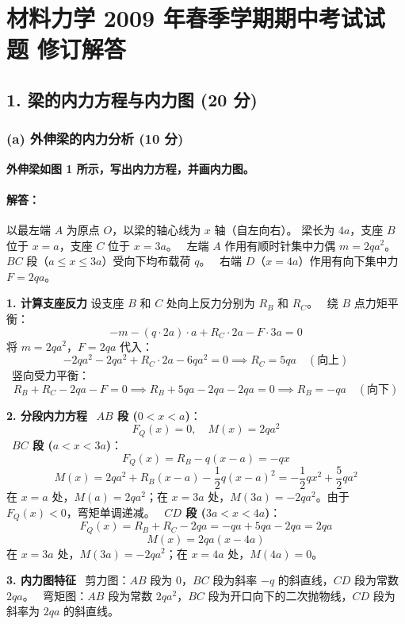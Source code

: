 \documentclass[11pt,a4paper]{ctexrep}
\begin{document}
\chapter{材料力学 2009 年春季学期期中考试试题 修订解答}
{



\section*{1. 梁的内力方程与内力图 (20 分)}

\subsection*{(a) 外伸梁的内力分析 (10 分)}
\textbf{外伸梁如图 1 所示，写出内力方程，并画内力图。}

\subsubsection*{解答：}
以最左端 $A$ 为原点 $O$，以梁的轴心线为 $x$ 轴（自左向右）。
梁长为 $4a$，支座 $B$ 位于 $x=a$，支座 $C$ 位于 $x=3a$。
\noindent\textbullet\ 左端 $A$ 作用有顺时针集中力偶 $m = 2qa^2$。
\noindent\textbullet\ $BC$ 段（$a \le x \le 3a$）受向下均布载荷 $q$。
\noindent\textbullet\ 右端 $D$（$x=4a$）作用有向下集中力 $F = 2qa$。

\textbf{1. 计算支座反力}
设支座 $B$ 和 $C$ 处向上反力分别为 $R_B$ 和 $R_C$。
\noindent\textbullet\ 绕 $B$ 点力矩平衡：
  \[
  -m - (q \cdot 2a) \cdot a + R_C \cdot 2a - F \cdot 3a = 0
  \]
  将 $m = 2qa^2$，$F = 2qa$ 代入：
  \[
  -2qa^2 - 2qa^2 + R_C \cdot 2a - 6qa^2 = 0 \implies R_C = 5qa \quad (\text{向上})
  \]
\noindent\textbullet\ 竖向受力平衡：
  \[
  R_B + R_C - 2qa - F = 0 \implies R_B + 5qa - 2qa - 2qa = 0 \implies R_B = -qa \quad (\text{向下})
  \]

\textbf{2. 分段内力方程}
\noindent\textbullet\ \textbf{$AB$ 段 ($0 < x < a$)}：
  \[
  F_Q(x) = 0, \quad M(x) = 2qa^2
  \]
\noindent\textbullet\ \textbf{$BC$ 段 ($a < x < 3a$)}：
  \[
  F_Q(x) = R_B - q(x-a) = -qx
  \]
  \[
  M(x) = 2qa^2 + R_B(x-a) - \frac{1}{2}q(x-a)^2 = -\frac{1}{2}qx^2 + \frac{5}{2}qa^2
  \]
  在 $x=a$ 处，$M(a) = 2qa^2$；在 $x=3a$ 处，$M(3a) = -2qa^2$。由于 $F_Q(x) < 0$，弯矩单调递减。
\noindent\textbullet\ \textbf{$CD$ 段 ($3a < x < 4a$)}：
  \[
  F_Q(x) = R_B + R_C - 2qa = -qa + 5qa - 2qa = 2qa
  \]
  \[
  M(x) = 2qa(x-4a)
  \]
  在 $x=3a$ 处，$M(3a) = -2qa^2$；在 $x=4a$ 处，$M(4a) = 0$。

\textbf{3. 内力图特征}
\noindent\textbullet\ 剪力图：$AB$ 段为 0，$BC$ 段为斜率 $-q$ 的斜直线，$CD$ 段为常数 $2qa$。
\noindent\textbullet\ 弯矩图：$AB$ 段为常数 $2qa^2$，$BC$ 段为开口向下的二次抛物线，$CD$ 段为斜率为 $2qa$ 的斜直线。

}
\end{document}
